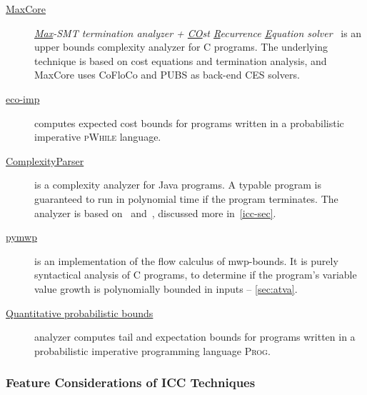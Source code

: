 \begin{description}
\item[\href{https://costa.fdi.ucm.es/maxcore/}{MaxCore}]%
      \emph{\underline{Max}-SMT termination analyzer + \underline{CO}st \underline{R}ecurrence \underline{E}quation solver}~\cite{albert2019}
      is an upper bounds complexity analyzer for C programs.
      The underlying technique is based on cost equations and termination analysis, and MaxCore uses CoFloCo and PUBS as back-end CES solvers.

\item[\href{https://www-sop.inria.fr/members/Martin.Avanzini/software/eco-imp/}{eco-imp}]\cite{avanzini2020}
      computes expected cost bounds for programs written in a probabilistic imperative \textsc{pWhile} language.

\item[\href{https://gitlab.inria.fr/complexityparser/complexityparser}{ComplexityParser}]\cite{hainry2021}
      is a complexity analyzer for Java programs.
      A typable program is guaranteed to run in polynomial time if the program terminates.
      The analyzer is based on~\cite{hainry2015} and~\cite{hainry2018}, discussed more in~\autoref{icc-sec}.

\item[\href{https://github.com/statycc/pymwp}{pymwp}]\cite{aubert2023b}
      is an implementation of the flow calculus of mwp-bounds.
      It is purely syntactical analysis of C programs, to determine if the program's variable value growth is polynomially bounded in inputs -- \autoref{sec:atva}.

\item[\href{https://zenodo.org/records/10457566}{Quantitative probabilistic bounds}]\cite{chatterjee2024}
      analyzer computes tail and expectation bounds for programs written
      in a probabilistic imperative programming language \textsc{Prog}.

\end{description}

\subsubsection{Feature Considerations of ICC Techniques}\label{icc-feat}

